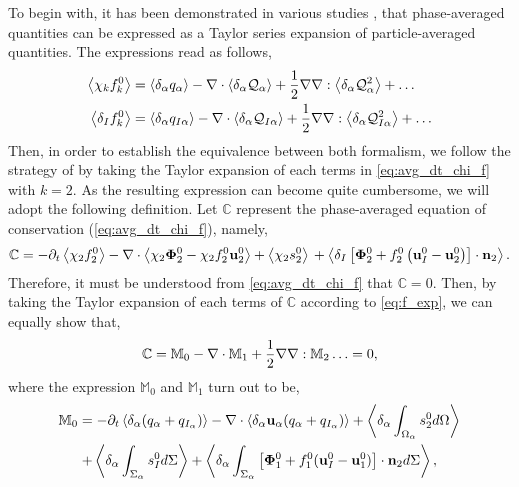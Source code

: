 To begin with, it has been demonstrated in various studies \citep{nott2011suspension,jackson1997locally,zhang1994averaged}, that phase-averaged quantities can be expressed as a Taylor series expansion of particle-averaged quantities. 
The expressions read as follows, 
\begin{align}
    \left<\chi_kf_k^0\right> 
    &=  \left<\delta_\alpha q_\alpha\right>
        - \mathbf{\nabla}\cdot  
        \left<\delta_\alpha \mathcal{Q}_\alpha\right>        
        + \frac{1}{2} \mathbf{\nabla}\mathbf{\nabla} : \left<\delta_\alpha \mathcal{Q}_\alpha^2\right>
        + \ldots  \\
    \left<\delta_I f_k^0\right> 
    &=  \left<\delta_\alpha q_{I\alpha}\right>        
        - \mathbf{\nabla}\cdot \left<\delta_\alpha \mathcal{Q}_{I\alpha}\right>
        + \frac{1}{2} \mathbf{\nabla}\mathbf{\nabla} : \left<\delta_\alpha \mathcal{Q}_{I\alpha}^{2}\right>
        + \ldots  
    \label{eq:f_exp}
\end{align}
Then, in order to establish the equivalence between both formalism, we follow the strategy of \citep{lhuillier2000bilan} by taking the Taylor expansion of each terms in \ref{eq:avg_dt_chi_f} with $k=2$. 
As the resulting expression can become quite cumbersome, we will adopt the following definition. 
Let $\mathbb{C}$ represent the phase-averaged equation of conservation (\ref{eq:avg_dt_chi_f}), namely, 
\begin{equation*}
    \mathbb{C}
    =
    - \partial_t \left<\chi_2f_2^0\right>
    - \mathbf{\nabla}\cdot \left<\chi_2 \mathbf{\Phi}_2^0 - \chi_2f_2^0 \textbf{u}_2^0\right>
    + \left<\chi_2 s_2^0\right>\\
    + \left<\delta_I\left[
        \mathbf{\Phi}_2^0
        + f_2^0
        \left(
            \textbf{u}_I^0
            - \textbf{u}_2^0
        \right)
    \right]
    \cdot \textbf{n}_2\right>. 
\end{equation*}
Therefore, it must be understood from \ref{eq:avg_dt_chi_f} that $\mathbb{C}=0$.
Then, by taking the Taylor expansion of each terms of $\mathbb{C}$ according to \ref{eq:f_exp}, we can equally show that,
\begin{equation}
    \mathbb{C} = \mathbb{M}_0 - \mathbf{\nabla}\cdot \mathbb{M}_1 + \frac{1}{2} \mathbf{\nabla}\mathbf{\nabla} : \mathbb{M}_2 \ldots = 0,
    \label{eq:scheme_equivalence}
\end{equation} 
where the expression $\mathbb{M}_0$ and $\mathbb{M}_1$ turn out to be, 
\begin{multline*}
    \mathbb{M}_0
    = 
    - \partial_t \left<\delta_\alpha (q_\alpha+q_{I_\alpha})\right>
    - \mathbf{\nabla}\cdot \left<\delta_\alpha\textbf{u}_\alpha(q_\alpha+q_{I_\alpha})\right>
    + \left<\delta_\alpha\int_{\Omega_\alpha} s_2^0 d\Omega\right>\\
    + \left<\delta_\alpha\int_{\Sigma_\alpha} s_I^0 d\Sigma\right>
    + \left<\delta_\alpha\int_{\Sigma_\alpha} 
    \left[\mathbf{\Phi}_1^0 
    + f_1^0 (\textbf{u}_I^0-\textbf{u}_1^0) \right] \cdot \textbf{n}_2 d\Sigma\right>,
\end{multline*}
